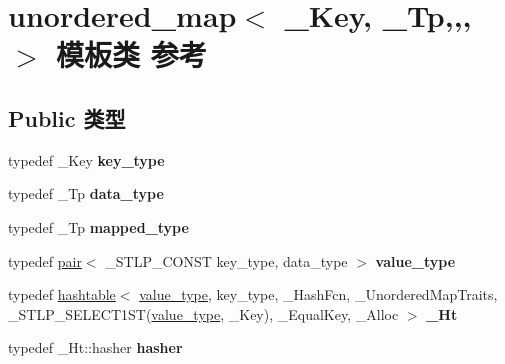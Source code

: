 \hypertarget{classunordered__map}{}\section{unordered\+\_\+map$<$ \+\_\+\+Key, \+\_\+\+Tp,,, $>$ 模板类 参考}
\label{classunordered__map}
\subsection*{Public 类型}
\begin{DoxyCompactItemize}
\item 
\mbox{\label{classunordered__map_a3c2437bba45c98d91164848e74335673}} 
typedef \+\_\+\+Key {\bfseries key\+\_\+type}
\item 
\mbox{\label{classunordered__map_a8fcdea6e3db7084dcbff98aea805f127}} 
typedef \+\_\+\+Tp {\bfseries data\+\_\+type}
\item 
\mbox{\label{classunordered__map_a69e8e71aa95a12cea4e91453103b9b2e}} 
typedef \+\_\+\+Tp {\bfseries mapped\+\_\+type}
\item 
\mbox{\label{classunordered__map_ad974c87e4ff56b733210905ba196dfd5}} 
typedef \hyperlink{structpair}{pair}$<$ \+\_\+\+S\+T\+L\+P\+\_\+\+C\+O\+N\+ST key\+\_\+type, data\+\_\+type $>$ {\bfseries value\+\_\+type}
\item 
\mbox{\label{classunordered__map_a072313259b58a576309e8222406be485}} 
typedef \hyperlink{classhashtable}{hashtable}$<$ \hyperlink{structpair}{value\+\_\+type}, key\+\_\+type, \+\_\+\+Hash\+Fcn, \+\_\+\+Unordered\+Map\+Traits, \+\_\+\+S\+T\+L\+P\+\_\+\+S\+E\+L\+E\+C\+T1\+ST(\hyperlink{structpair}{value\+\_\+type}, \+\_\+\+Key), \+\_\+\+Equal\+Key, \+\_\+\+Alloc $>$ {\bfseries \+\_\+\+Ht}
\item 
\mbox{\label{classunordered__map_a78181880d737416cca17d96115c0fd5e}} 
typedef \+\_\+\+Ht\+::hasher {\bfseries hasher}
\item 
\mbox{\label{classunordered__map_acc8f9199686dd20e2d74cd7d1aa9f997}} 

\end{DoxyCompactItemize}
